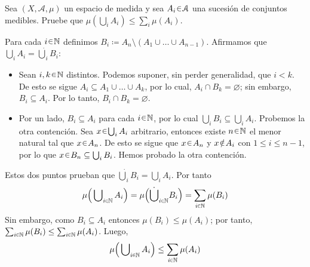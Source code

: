 \setcounter{neje}{28}
\begin{nejer}
Sea $(X, \mathcal{A}, \mu)$ un espacio de medida y sea $A_i \en \mathcal{A}$ una sucesión de conjuntos medibles. Pruebe que $\mu(\bigcup_i A_i) \leq \sum_i \mu(A_i)$.
\end{nejer}
\begin{sol}
Para cada $i\en\mathbb{N}$ definimos $B_i \coloneq A_{n}\setminus(A_1\cup\dots\cup A_{n-1})$. Afirmamos que $\bigcup_iA_i= \dot\bigcup_iB_i$:
\begin{itemize}
\item Sean $i,k\en\mathbb{N}$ distintos. Podemos suponer, sin perder generalidad, que $i < k$. De esto se sigue $A_i \subseteq A_1 \cup \dots \cup A_k$, por lo cual, $A_i \cap B_k = \varnothing$; sin embargo, $B_i \subseteq A_i$. Por lo tanto, $B_i \cap B_k = \varnothing$.

\item Por un lado, $B_i \subseteq A_i$ para cada $i\en\mathbb{N}$, por lo cual $\bigcup_iB_i \subseteq \bigcup_iA_i$. Probemos la otra contención. Sea $x\en\bigcup_iA_i$ arbitrario, entonces existe $n\en\mathbb{N}$ el menor natural tal que $x\en A_n$. De esto se sigue que $x\en A_n$ y $x\noten A_i$ con $1 \leq i \leq n-1$, por lo que $x \en B_n \subseteq \bigcup_i B_i$. Hemos probado la otra contención.
\end{itemize}
Estos dos puntos prueban que $\dot\bigcup_iB_i = \bigcup_iA_i$. Por tanto
\[
\mu\Big(\bigcup\nolimits_{i\en\mathbb{N}}A_i\Big)%
= \mu\Big(\dot\bigcup_{i\en\mathbb{N}}B_i\Big)%
= \sum_{i\en\mathbb{N}} \mu(B_i)
\]
Sin embargo, como $B_i \subseteq A_i$ entonces $\mu(B_i) \leq \mu(A_i)$; por tanto, $\sum_{i\en\mathbb{N}}\mu(B_i) \leq \sum_{i\en\mathbb{N}}\mu(A_i)$. Luego,
\[
\mu\Big(\bigcup\nolimits_{i\en\mathbb{N}}A_i\Big)%
\leq%
\sum_{i\en\mathbb{N}}\mu(A_i)
\]
\end{sol}